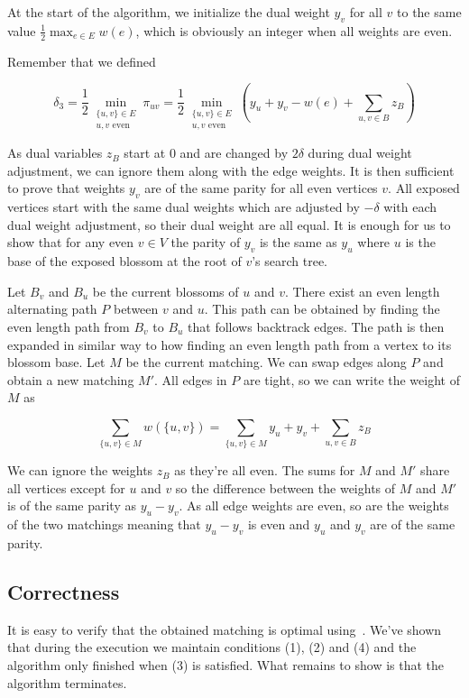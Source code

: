 At the start of the algorithm, we initialize the dual weight $y_v$ for all $v$ to the same value $\frac{1}{2}\max_{e \in E} w(e)$, which is obviously an integer when all weights are even.

Remember that we defined

\[\delta_3=\frac{1}{2}\min_{\substack{\{u, v\}\in E \\ \text{$u, v$ even}}} \pi_{uv} = \frac{1}{2}\min_{\substack{\{u, v\}\in E \\ \text{$u, v$ even}}} \left(y_u + y_v - w(e) + \sum_{u, v \in B} z_B\right)\] 

As dual variables $z_B$ start at $0$ and are changed by $2\delta$ during dual weight adjustment, we can ignore them along with the edge weights. It is then sufficient to prove that weights $y_v$ are of the same parity for all even vertices $v$. All exposed vertices start with the same dual weights which are adjusted by $-\delta$ with each dual weight adjustment, so their dual weight are all equal. It is enough for us to show that for any even $v \in V$ the parity of $y_v$ is the same as $y_u$ where $u$ is the base of the exposed blossom at the root of $v$'s search tree. 

Let $B_v$ and $B_u$ be the current blossoms of $u$ and $v$. There exist an even length alternating path $P$ between $v$ and $u$. This path can be obtained by finding the even length path from $B_v$ to $B_u$ that follows backtrack edges. The path is then expanded in similar way to how finding an even length path from a vertex to its blossom base. Let $M$ be the current matching. We can swap edges along $P$ and obtain a new matching $M'$. All edges in $P$ are tight, so we can write the weight of $M$ as

\[\sum_{\{u, v\} \in M} w(\{u, v\}) = \sum_{\{u, v\} \in M} y_u + y_v + \sum_{u, v \in B} z_B\]

We can ignore the weights $z_B$ as they're all even. The sums for $M$ and $M'$ share all vertices except for $u$ and $v$ so the difference between the weights of $M$ and $M'$ is of the same parity as $y_u - y_v$. As all edge weights are even, so are the weights of the two matchings meaning that $y_u - y_v$ is even and $y_u$ and $y_v$ are of the same parity.

\subsection{Correctness}

It is easy to verify that the obtained matching is optimal using~. We've shown that during the execution we maintain conditions (1), (2) and (4) and the algorithm only finished when (3) is satisfied. What remains to show is that the algorithm terminates.


